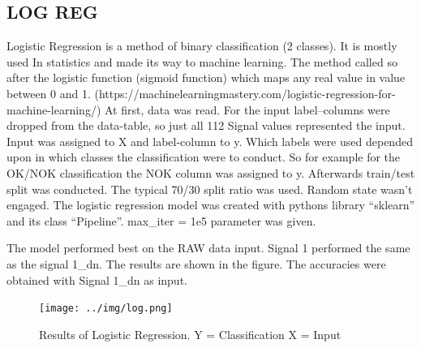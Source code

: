 \documentclass[12pt]{report}
\begin{document}
\subsection{LOG REG}
Logistic Regression is a method of binary classification (2 classes). It is mostly used In statistics and made its way to machine learning. The method called so after the logistic function (sigmoid function) which maps any real value in value between 0 and 1. (https://machinelearningmastery.com/logistic-regression-for-machine-learning/)
\newline
At first, data was read. For the input label–columns were dropped from the data-table, so just all 112 Signal values represented the input. Input was assigned to X and label-column to y. Which labels were used depended upon in which classes the classification were to conduct. So for example for the OK/NOK classification the NOK column was assigned to y. 
\newline
Afterwards train/test split was conducted. The typical 70/30 split ratio was used. Random state wasn’t engaged. The logistic regression model was created with pythons library “sklearn” and its class “Pipeline”. max\_iter = 1e5 parameter was given.\newline



The model performed best on the RAW data input. Signal 1 performed the same as the signal 1\_dn. The results are shown in the figure. The accuracies were obtained with Signal 1\_dn as input.
\begin{figure}[H]
	\texttt{[image: ../img/log.png]}
	\caption{Results of Logistic Regression. Y = Classification 
		X = Input 
	}
	\label{fig:log}
\end{figure}
\end{document}

